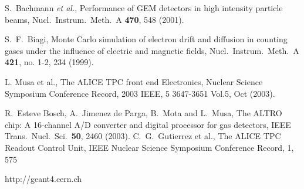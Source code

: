 \documentclass[preprint,5p]{elsarticle}
\begin{document}
\begin{thebibliography}{99}
 S.~Bachmann {\it et al.},
 Performance of GEM detectors in high intensity particle beams,
 Nucl.\ Instrum.\ Meth.\ A {\bf 470}, 548 (2001).

   S.~F.~Biagi,
  Monte Carlo simulation of electron drift and diffusion in counting gases 
  under the influence of electric and magnetic fields,
  Nucl.\ Instrum.\ Meth.\ A {\bf 421}, no. 1-2, 234 (1999).

 L. Musa et al., The ALICE TPC front end Electronics, Nuclear Science Symposium 
 Conference Record, 2003 IEEE, 5 3647-3651 Vol.5, Oct (2003).
 
 
   R.~Esteve Bosch, A.~Jimenez de Parga, B.~Mota and L.~Musa,
  The ALTRO chip: A 16-channel A/D converter and digital processor for gas 
  detectors,
  IEEE Trans.\ Nucl.\ Sci.\  {\bf 50}, 2460 (2003).
    C.~G.~Gutierrez et al., The ALICE TPC Readout Control Unit, IEEE Nuclear Science Symposium Conference Record, 1, 575 



http://geant4.cern.ch
 	

\end{thebibliography}
\end{document}
